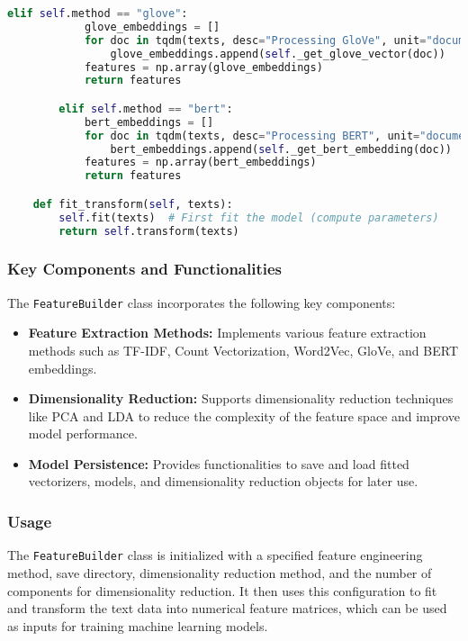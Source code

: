 \begin{lstlisting}[language=Python]
        elif self.method == "glove":
            glove_embeddings = []
            for doc in tqdm(texts, desc="Processing GloVe", unit="document"):
                glove_embeddings.append(self._get_glove_vector(doc))
            features = np.array(glove_embeddings)
            return features

        elif self.method == "bert":
            bert_embeddings = []
            for doc in tqdm(texts, desc="Processing BERT", unit="document"):
                bert_embeddings.append(self._get_bert_embedding(doc))
            features = np.array(bert_embeddings)
            return features

    def fit_transform(self, texts):
        self.fit(texts)  # First fit the model (compute parameters)
        return self.transform(texts)  
\end{lstlisting}

\subsubsection{Key Components and Functionalities}

The \texttt{FeatureBuilder} class incorporates the following key components:

\begin{itemize}
    \item \textbf{Feature Extraction Methods:} Implements various feature extraction methods such as TF-IDF, Count Vectorization, Word2Vec, GloVe, and BERT embeddings.
    \item \textbf{Dimensionality Reduction:} Supports dimensionality reduction techniques like PCA and LDA to reduce the complexity of the feature space and improve model performance.
    \item \textbf{Model Persistence:} Provides functionalities to save and load fitted vectorizers, models, and dimensionality reduction objects for later use.
\end{itemize}

\subsubsection{Usage}

The \texttt{FeatureBuilder} class is initialized with a specified feature engineering method, save directory, dimensionality reduction method, and the number of components for dimensionality reduction. It then uses this configuration to fit and transform the text data into numerical feature matrices, which can be used as inputs for training machine learning models.

